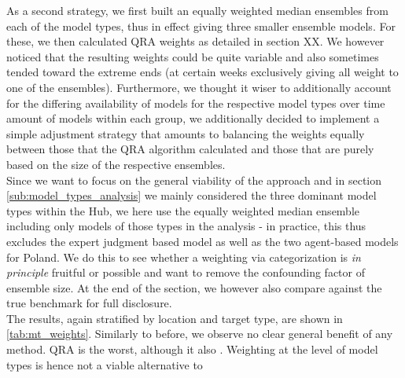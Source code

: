 As a second strategy, we first built an equally weighted median ensembles from each of the model types, thus in effect giving three smaller ensemble models. For these, we then calculated QRA weights as detailed in section XX. We however noticed that the resulting weights could be quite variable and also sometimes tended toward the extreme ends (at certain weeks exclusively giving all weight to one of the ensembles). Furthermore, we thought it wiser to additionally account for the differing availability of models for the respective model types over time amount of models within each group, we additionally decided to implement a simple adjustment strategy that amounts to balancing the weights equally between those that the QRA algorithm calculated and those that are purely based on the size of the respective ensembles.\\
Since we want to focus on the general viability of the approach and in section \ref{sub:model_types_analysis} we mainly considered the three dominant model types within the Hub, we here use the equally weighted median ensemble including only models of those types in the analysis - in practice, this thus excludes the expert judgment based model as well as the two agent-based models for Poland. We do this to see whether a weighting via categorization is \textit{in principle} fruitful or possible and want to remove the confounding factor of ensemble size. At the end of the section, we however also compare against the true benchmark for full disclosure. \\ 
The results, again stratified by location and target type, are shown in \ref{tab:mt_weights}. Similarly to before, we observe no clear general benefit of any method. QRA is the worst, although it also . Weighting at the level of model types is hence not a viable alternative to 
